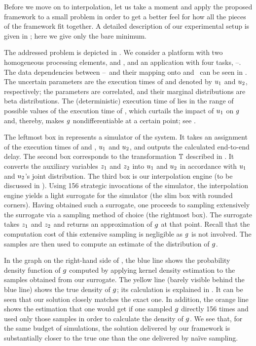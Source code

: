 Before we move on to interpolation, let us take a moment and apply the proposed
framework to a small problem in order to get a better feel for how all the
pieces of the framework fit together. A detailed description of our experimental
setup is given in ; here we give only the bare minimum.

\newcommand{\cores}{\token{PE1} and \token{PE2}}
\newcommand{\tasks}{\token{T1}--\token{T4}}
The addressed problem is depicted in . We consider a platform with
two homogeneous processing elements, \cores, and an application with four tasks,
\tasks. The data dependencies between \tasks\ and their mapping onto \cores\ can
be seen in .  The
uncertain parameters are the execution times of  and 
denoted by $u_1$ and $u_2$, respectively; the parameters are correlated, and
their marginal distributions are beta distributions. The (deterministic)
execution time of  lies in the range of possible values of the
execution time of , which curtails the impact of $u_1$ on $g$ and,
thereby, makes $g$ nondifferentiable at a certain point; see .

The leftmost box in  represents a simulator of the system. It
takes an assignment of the execution times of  and , $u_1$
and $u_2$, and outputs the calculated end-to-end delay. The second box
corresponds to the transformation $\mathbb{T}$ described in
. It converts the auxiliary variables $z_1$ and $z_2$ into
$u_1$ and $u_2$ in accordance with $u_1$ and $u_2$'s joint distribution. The
third box is our interpolation engine (to be discussed in ).
Using 156 strategic invocations of the simulator, the interpolation engine
yields a light surrogate for the simulator (the slim box with rounded corners).
Having obtained such a surrogate, one proceeds to sampling extensively the
surrogate via a sampling method of choice (the rightmost box). The surrogate
takes $z_1$ and $z_2$ and returns an approximation of $g$ at that point.
Recall that the computation cost of this extensive sampling is negligible as
$g$ is not involved. The samples are then used to compute an estimate of the
distribution of $g$.

In the graph on the right-hand side of , the blue line shows the
probability density function of $g$ computed by applying kernel density
estimation to the samples obtained from our surrogate. The yellow line (barely
visible behind the blue line) shows the true density of $g$; its calculation is
explained in . It can be seen that our solution closely
matches the exact one. In addition, the orange line shows the estimation that
one would get if one sampled $g$ directly 156 times and used only those samples
in order to calculate the density of $g$. We see that, for the same budget of
simulations, the solution delivered by our framework is substantially closer to
the true one than the one delivered by na\"{i}ve sampling.
